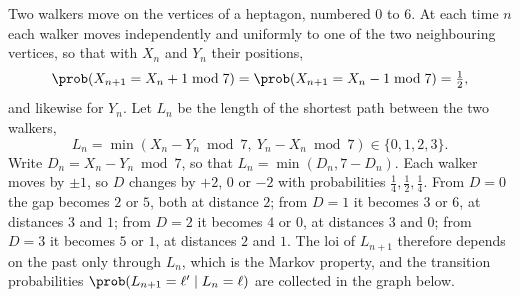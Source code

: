 \begin{example}
  Two walkers move on the vertices of a heptagon, numbered $0$ to $6$. At each
  time $n$ each walker moves independently and uniformly to one of the two
  neighbouring vertices, so that with $X_{n}$ and $Y_{n}$ their positions,
  \[ \prob(X_{n+1} = X_{n} + 1 \bmod 7)
       = \prob(X_{n+1} = X_{n} - 1 \bmod 7) = \tfrac{1}{2}, \]
  and likewise for $Y_{n}$. Let $L_{n}$ be the length of the shortest path
  between the two walkers,
  \[ L_{n} = \min(X_{n} - Y_{n} \bmod 7,\ Y_{n} - X_{n} \bmod 7)
       \in \{0,1,2,3\}. \]
  Write $D_{n} = X_{n} - Y_{n} \bmod 7$, so that $L_{n} = \min(D_{n}, 7-D_{n})$.
  Each walker moves by $\pm 1$, so $D$ changes by $+2$, $0$ or $-2$ with
  probabilities $\tfrac14, \tfrac12, \tfrac14$. From $D=0$ the gap becomes $2$ or
  $5$, both at distance $2$; from $D=1$ it becomes $3$ or $6$, at distances $3$
  and $1$; from $D=2$ it becomes $4$ or $0$, at distances $3$ and $0$; from $D=3$
  it becomes $5$ or $1$, at distances $2$ and $1$. The loi of $L_{n+1}$
  therefore depends on the past only through $L_{n}$, which is the Markov
  property, and the transition probabilities
  $\prob(L_{n+1} = \ell' \mid L_{n} = \ell)$ are collected in the graph below.\\

  \begin{center}
  \end{center}


\end{example}
